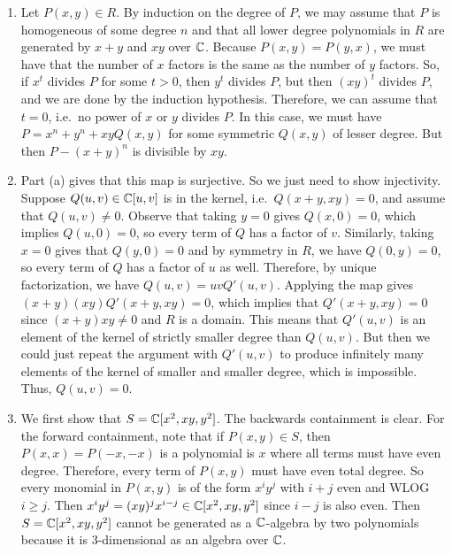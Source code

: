 \begin{solution}
\begin{enumerate}
    \item Let $P(x,y) \in R$. By induction on the degree of $P$, we may assume that $P$ is homogeneous of some degree $n$ and that all lower degree polynomials in $R$ are generated by $x+y$ and $xy$ over $\mathbb{C}$. Because $P(x,y)=P(y,x)$, we must have that the number of $x$ factors is the same as the number of $y$ factors. So, if $x^t$ divides $P$ for some $t>0$, then $y^t$ divides $P$, but then $(xy)^t$ divides $P$, and we are done by the induction hypothesis. Therefore, we can assume that $t=0$, i.e.\ no power of $x$ or $y$ divides $P$. In this case, we must have $P = x^n + y^n + xyQ(x,y)$ for some symmetric $Q(x,y)$ of lesser degree. But then $P - (x+y)^n$ is divisible by $xy$.
    \item Part (a) gives that this map is surjective. So we just need to show injectivity. Suppose $Q(u,v) \in \mathbb{C}[u,v]$ is in the kernel, i.e.\ $Q(x+y,xy)=0$, and assume that $Q(u,v) \neq 0$. Observe that taking $y=0$ gives $Q(x,0)=0$, which implies $Q(u,0) = 0$, so every term of $Q$ has a factor of $v$. Similarly, taking $x=0$ gives that $Q(y,0)=0$ and by symmetry in $R$, we have $Q(0,y)=0$, so every term of $Q$ has a factor of $u$ as well. Therefore, by unique factorization, we have $Q(u,v)=uvQ'(u,v)$. Applying the map gives $(x+y)(xy)Q'(x+y,xy)=0$, which implies that $Q'(x+y,xy)=0$ since $(x+y)xy \neq 0$ and $R$ is a domain. This means that $Q'(u,v)$ is an element of the kernel of strictly smaller degree than $Q(u,v)$. But then we could just repeat the argument with $Q'(u,v)$ to produce infinitely many elements of the kernel of smaller and smaller degree, which is impossible. Thus, $Q(u,v) = 0$.
    \item We first show that $S=\mathbb{C}[x^2,xy,y^2]$. The backwards containment is clear. For the forward containment, note that if $P(x,y) \in S$, then $P(x,x)=P(-x,-x)$ is a polynomial is $x$ where all terms must have even degree. Therefore, every term of $P(x,y)$ must have even total degree. So every monomial in $P(x,y)$ is of the form $x^iy^j$ with $i+j$ even and WLOG $i \geq j$. Then $x^iy^j = (xy)^j x^{i-j} \in \mathbb{C}[x^2,xy,y^2]$ since $i-j$ is also even. Then $S=\mathbb{C}[x^2,xy,y^2]$ cannot be generated as a $\mathbb{C}$-algebra by two polynomials because it is $3$-dimensional as an algebra over $\mathbb{C}$.
\end{enumerate}
\end{solution}

